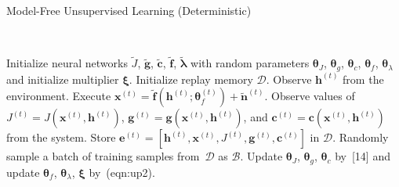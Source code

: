 \documentclass{article}
\begin{document}

\begin{algorithm}[!htb]
	\caption{\small Model-Free Unsupervised Learning (Deterministic)}\
	\small
	\begin{algorithmic}[1]
		\STATE Initialize neural networks $\tilde J$, $\tilde {\mathbf g}$, $\tilde {\mathbf c}$, $\tilde {\mathbf f}$, $\tilde{\bm \lambda}$ with random parameters $\bm \theta_{J}$, $\bm \theta_{g}$, $\bm \theta_c$, $\bm \theta_f$, $\bm \theta_\lambda$ and initialize multiplier $\bm \xi$.
		\STATE Initialize replay memory $\mathcal{D}$.
		\STATE Observe $\mathbf h^{(t)}$ from the environment.
		\STATE Execute $\mathbf x^{(t)} = \tilde{\mathbf f}(\mathbf h^{(t)};\bm \theta_f^{(t)}) + \tilde{\mathbf n}^{(t)}$.
		\STATE Observe values of $J^{(t)} = J(\mathbf x^{(t)}, \mathbf h^{(t)})$, $\mathbf g^{(t)} = \mathbf g(\mathbf x^{(t)}, \mathbf h^{(t)})$, and $\mathbf c^{(t)} = \mathbf c(\mathbf x^{(t)}, \mathbf h^{(t)})$ from the system.
		\STATE Store $\mathbf e^{(t)} = [\mathbf h^{(t)}, \mathbf{x}^{(t)}, J^{(t)}, \mathbf g^{(t)}, \mathbf c^{(t)}]$  in $\mathcal D$.
		\STATE Randomly sample a batch of training samples from~$\mathcal{D}$ as $\mathcal{B}$.
		\STATE Update  $\bm \theta_{J}$, $\bm \theta_{g}$, $\bm \theta_c$ by~[14] and update  $\bm \theta_f$, $\bm \theta_\lambda$, $\bm \xi$ by~(eqn:up2).
		\ENDFOR
	\end{algorithmic}
\end{algorithm}
\end{document}
